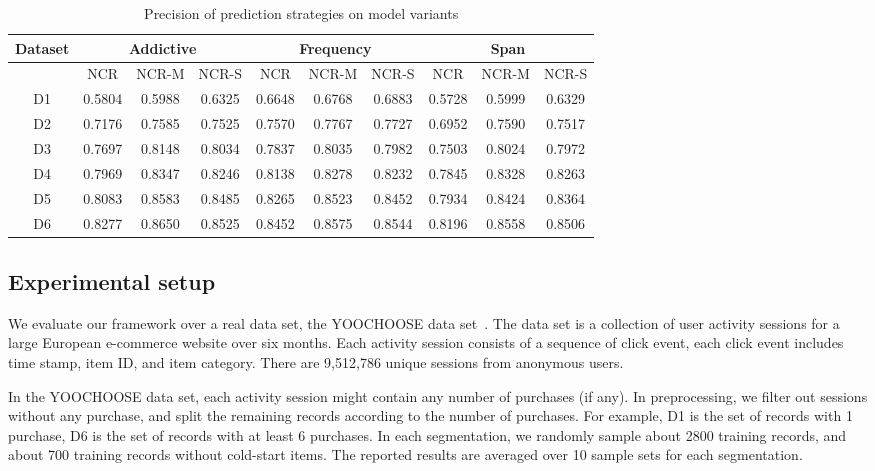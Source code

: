 \documentclass[sigconf]{acmart}
\begin{document}
\begin{table*}[htbp]
\caption{Precision of prediction strategies on model variants }
\label{tab:strategy}
\begin{tabular}{|c|c|c|c|c|c|c|c|c|c|}
\hline
Dataset & \multicolumn{3}{|c|}{Addictive} &  \multicolumn{3}{|c|}{Frequency} & \multicolumn{3}{|c|}{Span} \\\hline
  & NCR & NCR-M & NCR-S  & NCR & NCR-M & NCR-S  & NCR & NCR-M & NCR-S \\\hline
D1 & 0.5804	& 0.5988	& 0.6325& 	0.6648& 	0.6768& 	0.6883& 	0.5728	& 0.5999	& 0.6329 \\\hline
D2& 0.7176	& 0.7585	& 0.7525	& 0.7570	& 0.7767	& 0.7727	& 0.6952	& 0.7590& 	0.7517	\\\hline
D3& 0.7697	& 0.8148	& 0.8034	& 0.7837& 	0.8035	& 0.7982	& 0.7503	& 0.8024& 	0.7972	\\\hline
D4& 0.7969& 	0.8347	& 0.8246	& 0.8138	& 0.8278	& 0.8232& 	0.7845	& 0.8328	& 0.8263\\\hline
D5& 0.8083	& 0.8583& 	0.8485& 	0.8265& 	0.8523& 	0.8452	& 0.7934 &	0.8424& 	0.8364\\\hline
D6& 0.8277	& 0.8650	& 0.8525	& 0.8452& 	0.8575& 	0.8544& 	0.8196	& 0.8558	& 0.8506	\\ \hline 
\end{tabular}
\end{table*}

\subsection{Experimental setup}


We evaluate our framework over a real data set, the YOOCHOOSE data set~\cite{Ben-Shimon2015RecSys}. The data set is a collection of user activity sessions for a large
European e-commerce website over six months. Each activity session consists of a sequence of click event, each click event includes time stamp, item ID, and item category. There are 9,512,786 unique sessions from anonymous users. 

In the YOOCHOOSE data set, each activity session might contain any number of purchases (if any). In preprocessing, we filter out sessions without any purchase, and split the remaining records according to the number of purchases. For example, D1 is the set of records with 1 purchase, D6 is the set of records with at least 6 purchases. In each segmentation, we randomly sample about 2800 training records, and about 700 training records without cold-start items. The reported results are averaged over 10  sample sets for each segmentation.
  
\end{document}
